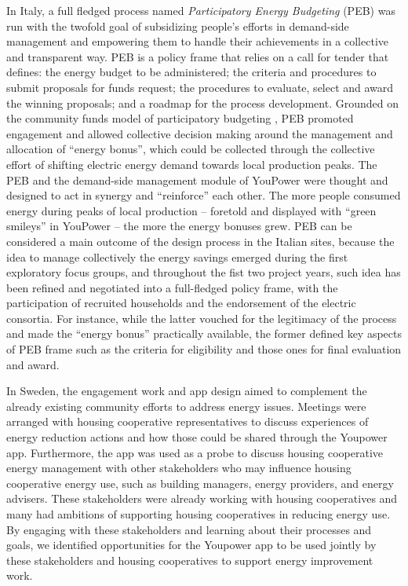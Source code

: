 In Italy, a full fledged process named \textit{Participatory Energy Budgeting} (PEB) \cite{capaccioli_exploring_2017,capaccioli_exploring_2016}
was run with the twofold goal of subsidizing people's efforts in demand-side management
and empowering them to handle their achievements in a collective and transparent way.
%
PEB is a policy frame that relies on a call for tender that
defines: the energy budget to be administered;
the criteria and procedures to submit proposals for funds request; the procedures
to evaluate, select and award the winning proposals; and a roadmap for the process development. 
Grounded on the community funds model of participatory budgeting \cite{Ganuza2012,Sintomer2008},
PEB promoted engagement and allowed collective decision
making around the management and allocation of ``energy bonus'', which could be
collected through the collective effort of shifting electric energy demand
towards local production peaks.
% 
The PEB and the demand-side management module of YouPower
were thought and designed to act in synergy and ``reinforce'' each other.
The more people consumed energy during peaks of local production -- foretold and displayed
with ``green smileys'' in YouPower -- the more the energy bonuses grew.
% 
PEB can be considered a main outcome of the design process in the Italian sites, because 
the idea to manage collectively the energy savings emerged during the first exploratory focus groups,
and throughout the fist two project years, such idea has been refined and negotiated into
a full-fledged policy frame, with the participation of recruited households and the endorsement
of the electric consortia. For instance, while the latter vouched for the legitimacy of the process
and made the ``energy bonus'' practically available, the former defined key aspects of PEB frame such as the criteria for eligibility and those ones for final evaluation and award.  


In Sweden, the engagement work and app design aimed to complement the already existing community efforts to address energy issues. Meetings were arranged with housing cooperative representatives to discuss experiences of energy reduction actions and how those could be shared through the Youpower app. Furthermore, the app was used as a probe to discuss housing cooperative energy management with other stakeholders who may influence housing cooperative energy use, such as building managers, energy providers, and energy advisers. These stakeholders were already working with housing cooperatives and many had ambitions of supporting housing cooperatives in reducing energy use. By engaging with these stakeholders and learning about their processes and goals, we identified opportunities for the Youpower app to be used jointly by these stakeholders and housing cooperatives to support energy improvement work.


